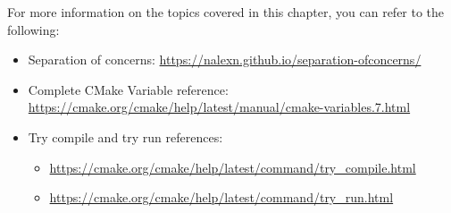 

For more information on the topics covered in this chapter, you can refer to the following:

\begin{itemize}
\item 
Separation of concerns: \url{https://nalexn.github.io/separation-ofconcerns/}

\item 
Complete CMake Variable reference: \url{https://cmake.org/cmake/help/latest/manual/cmake-variables.7.html}

\item 
Try compile and try run references:
\begin{itemize}
\item 
\url{https://cmake.org/cmake/help/latest/command/try_compile.html}

\item 
\url{https://cmake.org/cmake/help/latest/command/try_run.html}

\end{itemize}
\end{itemize}
